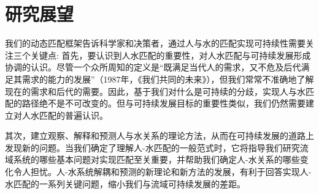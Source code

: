 \section{研究展望}

我们的动态匹配框架告诉科学家和决策者，通过人与水的匹配实现可持续性需要关注三个关键点:
首先，要认识到人水匹配的重要性，对人水匹配与可持续发展形成协调的认识。尽管一个众所周知的定义是“既满足当代人的需求，又不危及后代满足其需求的能力的发展”（1987年，《我们共同的未来》），但我们常常不准确地了解现在的需求和后代的需要。因此，基于我们对什么是可持续的分歧，实现人与水匹配的路径绝不是不可改变的。但与可持续发展目标的重要性类似，我们仍然需要建立对人水匹配的普遍认识。

其次，建立观察、解释和预测人与水关系的理论方法，从而在可持续发展的道路上发现新的问题。当我们确定了理解人-水匹配的一般范式时，它将指导我们研究流域系统的哪些基本问题对实现匹配至关重要，并帮助我们确定人-水关系的哪些变化令人担忧。人-水系统解耦和预测的新理论和新方法的发展，有利于回答实现人-水匹配的一系列关键问题，缩小我们与流域可持续发展的差距。

